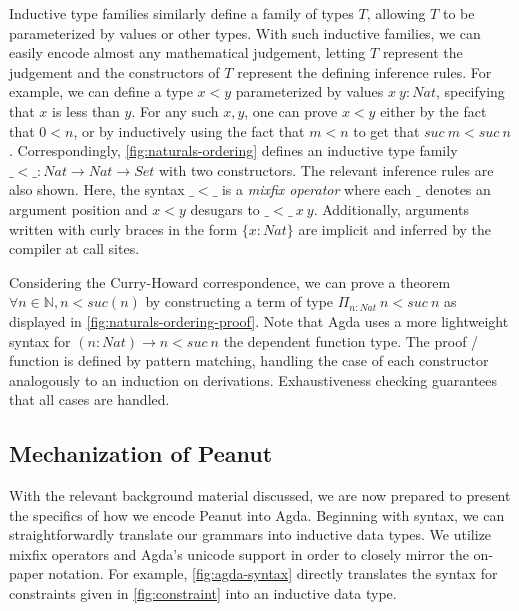 Inductive type families similarly define a family of types $T$, allowing $T$ to be parameterized by values or other types. With such inductive families, we can easily encode almost any mathematical judgement, letting $T$ represent the judgement and the constructors of $T$ represent the defining inference rules. For example, we can define a type $x < y$ parameterized by values $x~y : Nat$, specifying that $x$ is less than $y$. For any such $x, y$, one can prove $x < y$ either by the fact that $0 < n$, or by inductively using the fact that $m < n$ to get that $suc~m < suc~n$. Correspondingly, \autoref{fig:naturals-ordering} defines an inductive type family $\_{<}\_ : Nat \to Nat \to Set$ with two constructors. The relevant inference rules are also shown. Here, the syntax $\_{<}\_$ is a \emph{mixfix operator} where each $\_$ denotes an argument position and $x < y$ desugars to $\_{<}\_~x~y$. Additionally, arguments written with curly braces in the form $\{x : Nat\}$ are implicit and inferred by the compiler at call sites.



\pagebreak

Considering the Curry-Howard correspondence, we can prove a theorem $\forall n \in \mathbb{N}, n < suc(n)$ by constructing a term of type $\Pi_{n : Nat}~n < suc~n$ as displayed in \autoref{fig:naturals-ordering-proof}. Note that Agda uses a more lightweight syntax for  $(n : Nat) \to  n < suc~n$ the dependent function type. The proof / function is defined by pattern matching, handling the case of each constructor analogously to an induction on derivations. Exhaustiveness checking guarantees that all cases are handled.



\subsection{Mechanization of Peanut}\label{sec:mech-details}
With the relevant background material discussed, we are now prepared to present the specifics of how we encode Peanut into Agda. Beginning with syntax, we can straightforwardly translate our grammars into inductive data types. We utilize mixfix operators and Agda's unicode support in order to closely mirror the on-paper notation. For example, \autoref{fig:agda-syntax} directly translates the syntax for constraints given in \autoref{fig:constraint} into an inductive data type.



